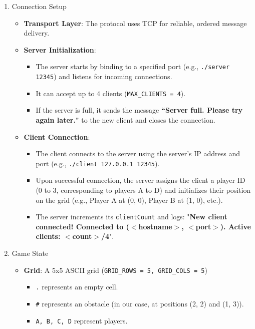 \documentclass{article}
\begin{document}
\begin{enumerate}
    \item Connection Setup
        \begin {itemize}
            \item \textbf{Transport Layer}: The protocol uses TCP for reliable, ordered message delivery.
            \item \textbf{Server Initialization}:
            \begin {itemize}
                \item The server starts by binding to a specified port (e.g., \texttt{./server 12345}) and listens for incoming connections.
                \item It can accept up to 4 clients (\texttt{MAX\_CLIENTS = 4}).
                \item If the server is full, it sends the message \textbf{``Server full. Please try again later."} to the new client and closes the connection.
            \end {itemize}
            \item \textbf{Client Connection}:
            \begin {itemize}
                \item The client connects to the server using the server's IP address and port (e.g., \texttt{./client 127.0.0.1 12345}).
                \item Upon successful connection, the server assigns the client a player ID (0 to 3, corresponding to players A to D) and initializes their position on the grid (e.g., Player A at (0, 0), Player B at (1, 0), etc.).
                \item The server increments its \texttt{clientCount} and logs: "\textbf{New client connected! Connected to ($<$hostname$>$, $<$port$>$). Active clients: $<$count$>$/4}".
            \end {itemize}
    \end {itemize}
    \item Game State
    \begin {itemize}
        \item \textbf{Grid}: A 5x5 ASCII grid (\texttt{GRID\_ROWS = 5, GRID\_COLS = 5})
        \begin {itemize}
            \item \texttt{.} represents an empty cell.
            \item \texttt{\#} represents an obstacle (in our case, at positions (2, 2) and (1, 3)).
            \item \texttt{A, B, C, D} represent players.

\end{itemize}
\end{itemize}
\end{enumerate}
\end{document}

